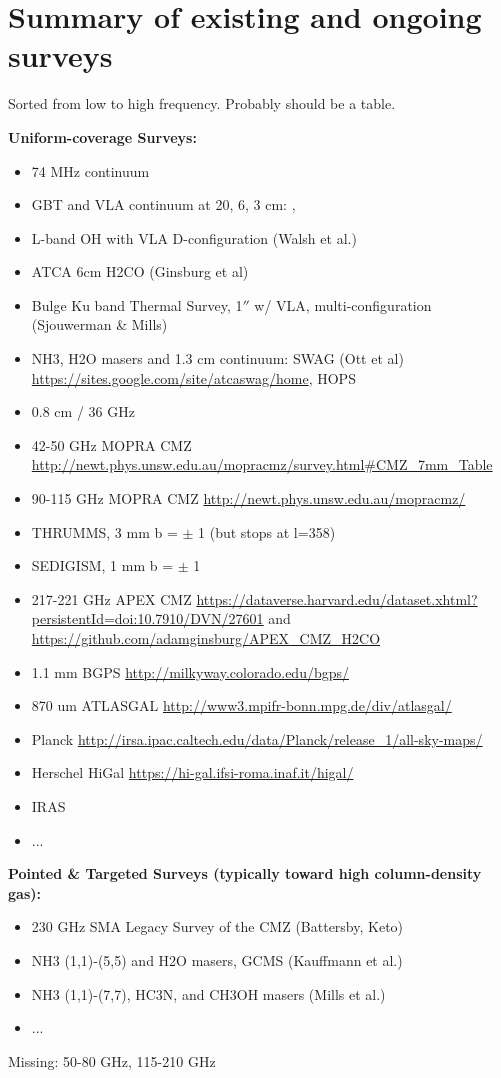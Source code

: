 \section{Summary of existing and ongoing surveys}
Sorted from low to high frequency.  Probably should be a table.

{\bf Uniform-coverage Surveys:}
\begin{itemize}
    \item 74 MHz continuum \citep{Yusef-Zadeh2013c}
    \item GBT and VLA continuum at 20, 6, 3 cm: \citet{Law2008a}, \citet{Law2008b}
    \item L-band OH with VLA D-configuration (Walsh et al.)
    \item ATCA 6cm H2CO (Ginsburg et al)
    \item Bulge Ku band Thermal Survey, 1$''$ w/ VLA, multi-configuration (Sjouwerman \& Mills)
    \item NH3, H2O masers and 1.3 cm continuum: SWAG (Ott et al) \url{https://sites.google.com/site/atcaswag/home}, HOPS \citep{Walsh2011a}
    \item 0.8 cm / 36 GHz \citep{Yusef-Zadeh2013a}
    \item 42-50 GHz MOPRA CMZ \url{http://newt.phys.unsw.edu.au/mopracmz/survey.html#CMZ_7mm_Table} \citep{Jones2013}
    \item 90-115 GHz MOPRA CMZ \url{http://newt.phys.unsw.edu.au/mopracmz/} \citep{Jones2012a}
    \item THRUMMS, 3 mm b = $\pm$ 1 (but stops at l=358)
    \item SEDIGISM, 1 mm b = $\pm$ 1 
    \item 217-221 GHz APEX CMZ \url{https://dataverse.harvard.edu/dataset.xhtml?persistentId=doi:10.7910/DVN/27601} and \url{https://github.com/adamginsburg/APEX_CMZ_H2CO}
    \item 1.1 mm BGPS \url{http://milkyway.colorado.edu/bgps/}
    \item 870 um ATLASGAL \url{http://www3.mpifr-bonn.mpg.de/div/atlasgal/}
    \item Planck \url{http://irsa.ipac.caltech.edu/data/Planck/release_1/all-sky-maps/}
    \item Herschel HiGal \url{https://hi-gal.ifsi-roma.inaf.it/higal/}
    \item IRAS
    \item ...
\end{itemize}

{\bf Pointed & Targeted Surveys (typically toward high column-density gas):}
\begin{itemize}
    \item 230 GHz SMA Legacy Survey of the CMZ (Battersby, Keto)
    \item NH3 (1,1)-(5,5) and H2O masers, GCMS (Kauffmann et al.)
    \item NH3 (1,1)-(7,7), HC3N, and CH3OH masers (Mills et al.)
    \item ...
\end{itemize}

Missing: 50-80 GHz, 115-210 GHz